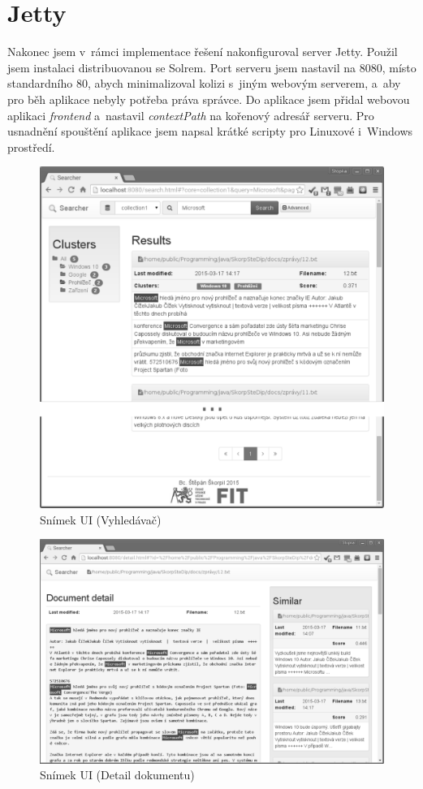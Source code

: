 \section{Jetty}
Nakonec jsem v~rámci implementace řešení nakonfiguroval server Jetty. Použil jsem instalaci distribuovanou se Solrem. Port serveru jsem nastavil na 8080, místo standardního 80, abych minimalizoval kolizi s~jiným webovým serverem, a~aby pro běh aplikace nebyly potřeba práva správce. Do aplikace jsem přidal webovou aplikaci \emph{frontend} a~nastavil \emph{contextPath} na kořenový adresář serveru. Pro usnadnění spouštění aplikace jsem napsal krátké scripty pro Linuxové i~Windows prostředí.

\begin{figure}[h]
\begin{center}
\includegraphics[width=13cm]{ScreenSearcher}
\caption{Snímek UI (Vyhledávač)}
\label{fig:ScreenSearcher}
\end{center}
\end{figure}

\begin{figure}[h]
\begin{center}
\includegraphics[width=13cm]{ScreenDetail}
\caption{Snímek UI (Detail dokumentu)}
\label{fig:ScreenDetail}
\end{center}
\end{figure}